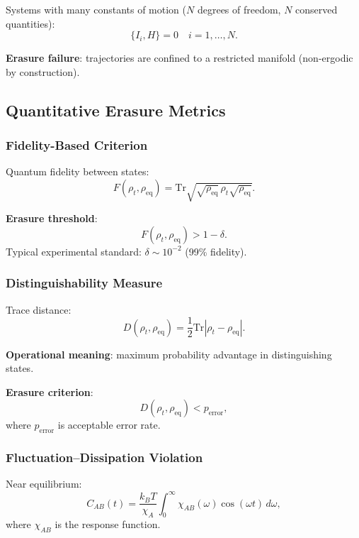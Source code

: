 \documentclass[11pt]{article}
\theoremstyle{defstyle}
\theoremstyle{mapstyle}
\begin{document}
Systems with many constants of motion ($N$ degrees of freedom, $N$ conserved quantities):
\[
\{I_i, H\} = 0 \quad i=1,\ldots,N.
\]

\textbf{Erasure failure}: trajectories are confined to a restricted manifold (non-ergodic by construction).

\subsection{Quantitative Erasure Metrics}

\subsubsection{Fidelity-Based Criterion}

Quantum fidelity between states:
\begin{equation}
F(\rho_t, \rho_{\text{eq}}) = \text{Tr}\sqrt{\sqrt{\rho_{\text{eq}}}\, \rho_t \sqrt{\rho_{\text{eq}}}}.
\end{equation}

\textbf{Erasure threshold}:
\begin{equation}
\boxed{F(\rho_t, \rho_{\text{eq}}) > 1 - \delta.}
\end{equation}
Typical experimental standard: $\delta \sim 10^{-2}$ (99\% fidelity).

\subsubsection{Distinguishability Measure}

Trace distance:
\begin{equation}
D(\rho_t, \rho_{\text{eq}}) = \frac{1}{2}\text{Tr}|\rho_t - \rho_{\text{eq}}|.
\end{equation}

\textbf{Operational meaning}: maximum probability advantage in distinguishing states.

\textbf{Erasure criterion}:
\begin{equation}
\boxed{D(\rho_t, \rho_{\text{eq}}) < p_{\text{error}},}
\end{equation}
where $p_{\text{error}}$ is acceptable error rate.

\subsubsection{Fluctuation--Dissipation Violation}

Near equilibrium:
\begin{equation}
C_{AB}(t) = \frac{k_B T}{\chi_A} \int_0^\infty \chi_{AB}(\omega)\cos(\omega t)\, d\omega,
\end{equation}
where $\chi_{AB}$ is the response function.
\end{document}
